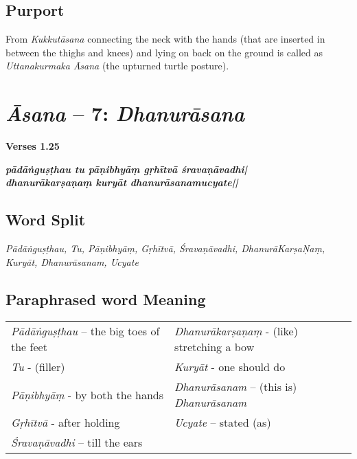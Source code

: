 \subsection*{Purport}

From \textit{Kukkutāsana} connecting the neck with the hands (that are inserted in between the thighs and knees) and lying on back on the ground is called as \textit{Uttanakurmaka} \textit{Āsana} (the upturned turtle posture).


\section*{\textit{Āsana} -- 7: \textit{Dhanurāsana}}

\noindent 
\textbf{Verses 1.25}

\begin{shloka}
\textit{\textbf{pādāṅguṣṭhau tu pāṇibhyāṃ gṛhītvā śravaṇāvadhi|}\\
\textbf{dhanurākarṣaṇaṃ kuryāt dhanurāsanamucyate||}}
\end{shloka}

\subsection*{Word Split}

\textit{Pādāṅguṣṭhau, Tu, Pāṇibhyāṃ, Gṛhītvā, Śravaṇāvadhi, Dhanurā\-Karṣa\-Ṇaṃ, Kuryāt, Dhanurāsanam, Ucyate}

\subsection*{Paraphrased word Meaning}

\begin{longtable}{>{\noindent\raggedright}p{5cm}>{\noindent\raggedright}p{5cm}}
\textit{Pādāṅguṣṭhau} – the big toes of the feet  & \textit{Dhanurākarṣaṇaṃ} - (like) stretching a bow \tabularnewline
\textit{Tu}  - (filler)  & \textit{Kuryāt}  - one should do\tabularnewline
\textit{Pāṇibhyāṃ} - by both the hands  & \textit{Dhanurāsanam} – (this is) \textit{Dhanurāsanam}\tabularnewline
\textit{Gṛhītvā}  - after holding  & \textit{Ucyate} – stated (as)\tabularnewline
\textit{Śravaṇāvadhi} – till the ears & 
\end{longtable}

